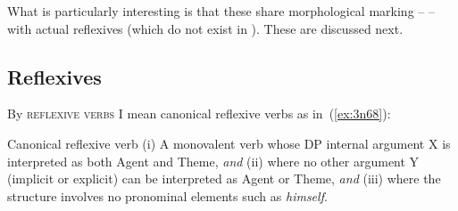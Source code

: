 \begin{exe}
\begin{xlist}
\begin{xlist}
\begin{exe}
\begin{xlist}
\begin{xlist}
\begin{exe}
\begin{xlist}
\begin{xlist}
\begin{exe}
\begin{exe}
\begin{xlist}
\begin{exe}
\begin{exe}
\begin{xlist}
\begin{exe}
\begin{exe}
\begin{exe}
\begin{exe}
\begin{exe}
\begin{xlist}
\begin{exe}
\begin{xlist}
\begin{exe}
\begin{exe}
\begin{xlist}
\begin{exe}
\begin{xlist}
\begin{exe}
\begin{xlist}
\begin{exe}
\begin{exe}
\begin{exe}
\begin{xlist}
\begin{exe}
\begin{exe}
\begin{exe}
\begin{xlist}
\begin{exe}
\begin{xlist}
\begin{exe}
\begin{xlist}
\begin{exe}
\begin{xlist}
\begin{exe}
\begin{exe}
\begin{exe}
\begin{exe}
\begin{xlist}
\begin{exe}
\begin{xlist}
\begin{exe}
\begin{xlist}
\begin{exe}
\begin{xlist}
\begin{exe}
\begin{xlist}
\begin{exe}
\begin{xlist}
\begin{exe}
\begin{exe}
\begin{exe}
\begin{exe}
\begin{xlist}
\begin{exe}
\begin{xlist}
\begin{exe}
\begin{xlist}
\begin{exe}
\begin{exe}
\begin{xlist}
\begin{exe}
\begin{xlist}
\begin{exe}
\begin{exe}
\begin{exe}
\begin{exe}
\begin{xlist}
\begin{xlist}
\begin{exe}
\begin{xlist}
\begin{exe}
\begin{exe}
\begin{exe}
\begin{xlist}
\begin{exe}
\begin{exe}
\begin{xlist}
		
 \z
\z 

What is particularly interesting is that these  share morphological marking -- \thit -- with actual reflexives (which do not exist in {\tnif}). These are discussed next.

	\subsection{Reflexives} \label{vz:thit:refl}
By \textsc{reflexive verbs} I mean canonical reflexive verbs as in~(\ref{ex:3n68}):
 \begin{exe}
\ex  \label{ex:3n68}Canonical reflexive verb
	(i) A monovalent verb whose DP internal argument X is interpreted as both Agent and Theme, \textit{and} (ii) where no other argument Y (implicit or explicit) can be interpreted as Agent or Theme, \textit{and} (iii) where the structure involves no pronominal elements such as \emph{himself}.
 \z 


\end{exe}
\end{xlist}
\end{exe}
\end{exe}
\end{xlist}
\end{exe}
\end{exe}
\end{exe}
\end{xlist}
\end{exe}
\end{xlist}
\end{xlist}
\end{exe}
\end{exe}
\end{exe}
\end{exe}
\end{xlist}
\end{exe}
\end{xlist}
\end{exe}
\end{exe}
\end{xlist}
\end{exe}
\end{xlist}
\end{exe}
\end{xlist}
\end{exe}
\end{exe}
\end{exe}
\end{exe}
\end{xlist}
\end{exe}
\end{xlist}
\end{exe}
\end{xlist}
\end{exe}
\end{xlist}
\end{exe}
\end{xlist}
\end{exe}
\end{xlist}
\end{exe}
\end{exe}
\end{exe}
\end{exe}
\end{xlist}
\end{exe}
\end{xlist}
\end{exe}
\end{xlist}
\end{exe}
\end{xlist}
\end{exe}
\end{exe}
\end{exe}
\end{xlist}
\end{exe}
\end{exe}
\end{exe}
\end{xlist}
\end{exe}
\end{xlist}
\end{exe}
\end{xlist}
\end{exe}
\end{exe}
\end{xlist}
\end{exe}
\end{xlist}
\end{exe}
\end{exe}
\end{exe}
\end{exe}
\end{exe}
\end{xlist}
\end{exe}
\end{exe}
\end{xlist}
\end{exe}
\end{exe}
\end{xlist}
\end{xlist}
\end{exe}
\end{xlist}
\end{xlist}
\end{exe}
\end{xlist}
\end{xlist}
\end{exe}
